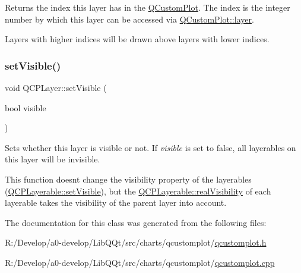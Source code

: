 Returns the index this layer has in the \mbox{\hyperlink{class_q_custom_plot}{Q\+Custom\+Plot}}. The index is the integer number by which this layer can be accessed via \mbox{\hyperlink{class_q_custom_plot_a0a96244e7773b242ef23c32b7bdfb159}{Q\+Custom\+Plot\+::layer}}.

Layers with higher indices will be drawn above layers with lower indices. \mbox{\label{class_q_c_p_layer_ac07671f74edf6884b51a82afb2c19516}} 
\subsubsection{\texorpdfstring{set\+Visible()}{setVisible()}}
{\footnotesize\ttfamily void Q\+C\+P\+Layer\+::set\+Visible (\begin{DoxyParamCaption}\item[{bool}]{visible }\end{DoxyParamCaption})}

Sets whether this layer is visible or not. If {\itshape visible} is set to false, all layerables on this layer will be invisible.

This function doesn\textquotesingle{}t change the visibility property of the layerables (\mbox{\hyperlink{class_q_c_p_layerable_a3bed99ddc396b48ce3ebfdc0418744f8}{Q\+C\+P\+Layerable\+::set\+Visible}}), but the \mbox{\hyperlink{class_q_c_p_layerable_ab054e88f15d485defcb95e7376f119e7}{Q\+C\+P\+Layerable\+::real\+Visibility}} of each layerable takes the visibility of the parent layer into account. 

The documentation for this class was generated from the following files\+:\begin{DoxyCompactItemize}
\item 
R\+:/\+Develop/a0-\/develop/\+Lib\+Q\+Qt/src/charts/qcustomplot/\mbox{\hyperlink{qcustomplot_8h}{qcustomplot.\+h}}\item 
R\+:/\+Develop/a0-\/develop/\+Lib\+Q\+Qt/src/charts/qcustomplot/\mbox{\hyperlink{qcustomplot_8cpp}{qcustomplot.\+cpp}}\end{DoxyCompactItemize}

